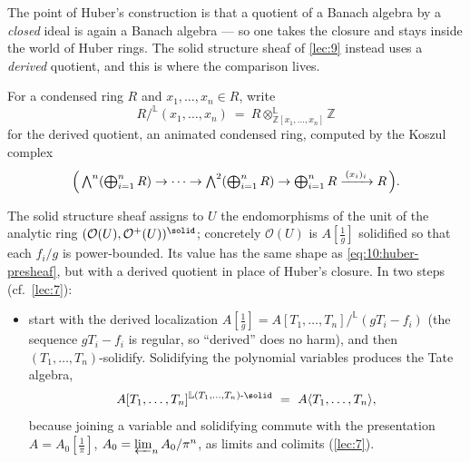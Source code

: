 The point of Huber's construction is that a quotient of a Banach algebra by a
\emph{closed} ideal is again a Banach algebra --- so one takes the closure and
stays inside the world of Huber rings. The solid structure sheaf of \cref{lec:9}
instead uses a \emph{derived} quotient, and this is where the comparison lives.

\begin{notation}
\label{not:10:koszul}
For a condensed ring $R$ and $x_{1},\dots,x_{n}\in R$, write
\begin{equation*}
R/^{\mathbb{L}}(x_{1},\dots,x_{n})\ =\ R\otimes^{\mathbb{L}}_{\mathbb{Z}[x_{1},\dots,x_{n}]}\mathbb{Z}
\end{equation*}
for the derived quotient, an animated condensed ring, computed by the Koszul
complex
\begin{equation*}
\Bigl(\,\textstyle\bigwedge^{n}(\textstyle\bigoplus_{i=1}^{n}R)\to\cdots\to
\bigwedge^{2}(\textstyle\bigoplus_{i=1}^{n}R)\to
\textstyle\bigoplus_{i=1}^{n}R\xrightarrow{\,(x_{i})_{i}\,}R\,\Bigr).
\end{equation*}
\end{notation}

\begin{remark}
\label{rmk:10:solid-value}
The solid structure sheaf assigns to $U$ the endomorphisms of the unit of the
analytic ring $(\mathcal O(U),\mathcal O^{+}(U))^{\solid}$; concretely
$\mathcal O(U)$ is $A[\tfrac1g]$ solidified so that each $f_{i}/g$ is
power-bounded. Its value has the same shape as \eqref{eq:10:huber-presheaf}, but
with a derived quotient in place of Huber's closure. In two steps
(cf.\ \cref{lec:7}):
\begin{itemize}
\item start with the derived localization
$A[\tfrac1g]=A[T_{1},\dots,T_{n}]/^{\mathbb{L}}(gT_{i}-f_{i})$ (the sequence
$gT_{i}-f_{i}$ is regular, so ``derived'' does no harm), and then
$(T_{1},\dots,T_{n})$-solidify. Solidifying the polynomial variables produces the
Tate algebra,
\begin{equation*}
A[T_{1},\dots,T_{n}]^{\mathbb{L}(T_{1},\dots,T_{n})\text{-}\solid}\ =\
A\langle T_{1},\dots,T_{n}\rangle,
\end{equation*}
because joining a variable and solidifying commute with the presentation
$A=A_{0}[\tfrac1\pi]$, $A_{0}=\varprojlim_{n}A_{0}/\pi^{n}$, as limits and
colimits (\cref{lec:7}).
\end{itemize}
\end{remark}

